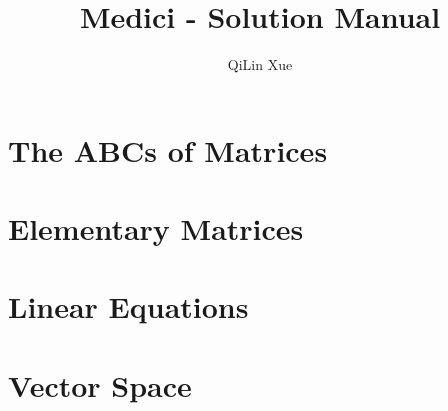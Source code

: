 \documentclass{article}
\title{Medici - Solution Manual}
\author{QiLin Xue}
\date{}
\begin{document}
\maketitle

\tableofcontents

\section{The ABCs of Matrices}





\section{Elementary Matrices}
\section{Linear Equations}
\section{Vector Space}




\end{document}
